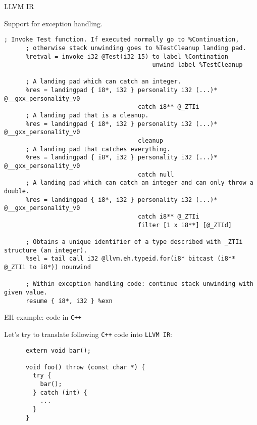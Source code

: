 \documentclass[8pt]{beamer}
\begin{document}
\begin{frame}[fragile]{LLVM IR}
  \begin{exampleblock}{Support for exception handling.}
    \begin{lstlisting}[basicstyle=\tiny\ttfamily,numbers=none]
      ; Invoke Test function. If executed normally go to %Continuation,
      ; otherwise stack unwinding goes to %TestCleanup landing pad.
      %retval = invoke i32 @Test(i32 15) to label %Contination
                                         unwind label %TestCleanup

      ; A landing pad which can catch an integer.
      %res = landingpad { i8*, i32 } personality i32 (...)* @__gxx_personality_v0
                                     catch i8** @_ZTIi
      ; A landing pad that is a cleanup.
      %res = landingpad { i8*, i32 } personality i32 (...)* @__gxx_personality_v0
                                     cleanup
      ; A landing pad that catches everything.
      %res = landingpad { i8*, i32 } personality i32 (...)* @__gxx_personality_v0
                                     catch null
      ; A landing pad which can catch an integer and can only throw a double.
      %res = landingpad { i8*, i32 } personality i32 (...)* @__gxx_personality_v0
                                     catch i8** @_ZTIi
                                     filter [1 x i8**] [@_ZTId]

      ; Obtains a unique identifier of a type described with _ZTIi structure (an integer).
      %sel = tail call i32 @llvm.eh.typeid.for(i8* bitcast (i8** @_ZTIi to i8*)) nounwind

      ; Within exception handling code: continue stack unwinding with given value.
      resume { i8*, i32 } %exn
    \end{lstlisting}
  \end{exampleblock}
\end{frame}

\begin{frame}[fragile]{EH example: code in \texttt{C++}}
  \begin{exampleblock}{Let's try to translate following \texttt{C++} code into
      \texttt{LLVM IR}:}
    \begin{lstlisting}
      extern void bar();

      void foo() throw (const char *) {
        try {
          bar();
        } catch (int) {
          ...
        }
      }
    \end{lstlisting}
  \end{exampleblock}
\end{frame}
\end{document}
